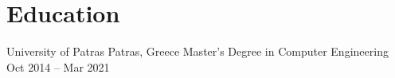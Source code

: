 \section{Education}

\begin{itemize}
    \cventryiv
        {University of Patras}
        {Patras, Greece}
        {Master's Degree in Computer Engineering}
        {Oct 2014 -- Mar 2021}
\end{itemize}
